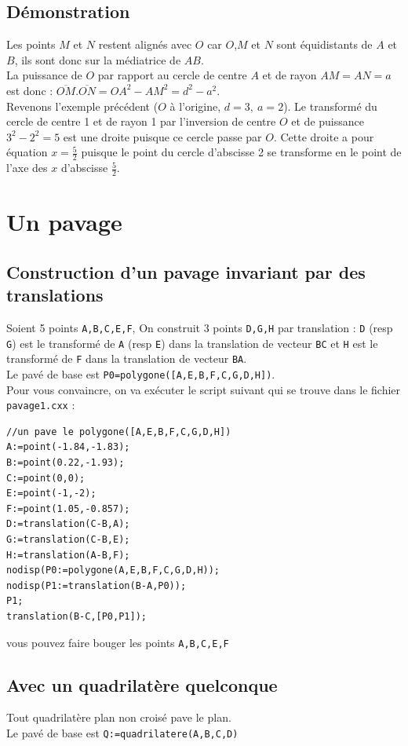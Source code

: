 \documentclass[a4paper,11pt]{book}
\begin{document}
\subsection{D\'emonstration}
Les points $M$ et $N$ restent align\'es avec $O$ car $O$,$M$ et $N$ sont 
\'equidistants de $A$ et $B$, ils sont donc sur la m\'ediatrice de $AB$.\\
La puissance de $O$ par rapport au cercle de centre $A$ et de rayon $AM=AN=a$ 
est donc : $\overline{OM}.\overline{ON}=OA^2-AM^2=d^2-a^2$.\\
Revenons \a l'exemple pr\'ec\'edent ($O$ \`a l'origine, $d=3,\ a=2$).
Le transform\'e du cercle de centre 1 et de rayon 1 par l'inversion de centre 
$O$ et de puissance $3^2-2^2=5$ est une droite puisque ce cercle passe par $O$.
Cette droite a pour \'equation $\displaystyle x=\frac{5}{2}$ puisque le point 
du cercle d'abscisse 2 se transforme en le point de l'axe des $x$ d'abscisse 
$\displaystyle \frac{5}{2}$.
\section{Un pavage}
\subsection{Construction d'un pavage invariant par des translations}
Soient 5 points  {\tt A,B,C,E,F}, On construit 3 points {\tt D,G,H} par 
translation : {\tt D} (resp  {\tt G}) est le transform\'e de {\tt A} (resp  
{\tt E}) dans la translation de vecteur {\tt BC} et {\tt H} est le 
transform\'e de {\tt F} dans la translation de vecteur {\tt BA}.\\
Le pav\'e de base est {\tt P0=polygone([A,E,B,F,C,G,D,H])}.\\
Pour vous convaincre, on va ex\'ecuter le script suivant qui se trouve dans
le fichier {\tt pavage1.cxx} :
\begin{verbatim}
//un pave le polygone([A,E,B,F,C,G,D,H])
A:=point(-1.84,-1.83);
B:=point(0.22,-1.93);
C:=point(0,0);
E:=point(-1,-2);
F:=point(1.05,-0.857);
D:=translation(C-B,A);
G:=translation(C-B,E);
H:=translation(A-B,F);
nodisp(P0:=polygone(A,E,B,F,C,G,D,H));
nodisp(P1:=translation(B-A,P0));
P1;
translation(B-C,[P0,P1]);
\end{verbatim}
vous pouvez faire bouger les points {\tt A,B,C,E,F}
\subsection{Avec un  quadrilat\`ere quelconque}
Tout quadrilat\`ere plan non crois\'e pave le plan.\\
Le pav\'e de base est {\tt Q:=quadrilatere(A,B,C,D)}
\end{document}
